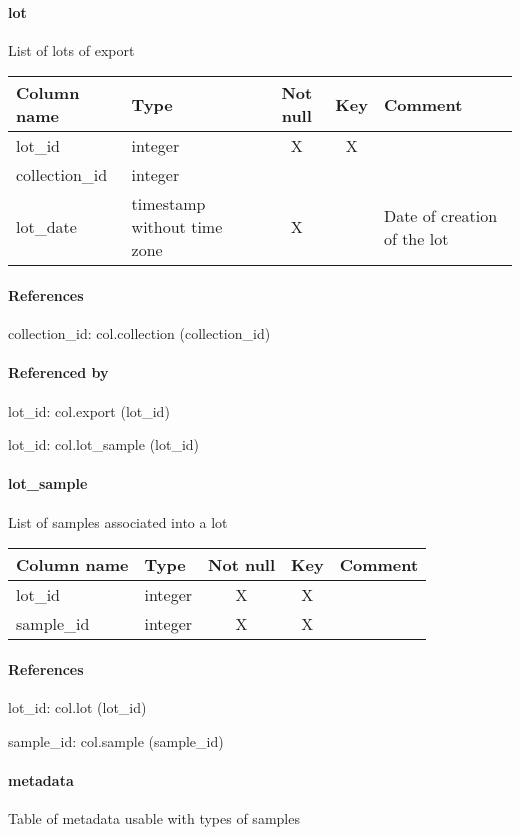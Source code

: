 \paragraph{lot}
List of lots of export

\begin{tabular}{|l| p{2cm}|c|c| p{5cm}|}
\hline
Column name & Type & Not null & Key & Comment \\
\hline
lot\_id & integer & X & X & \\
collection\_id & integer &  &  & \\
lot\_date & timestamp without time zone & X &  & Date of creation of the lot\\
\hline
\end{tabular}
\paragraph{References}
collection\_id: col.collection (collection\_id)

\paragraph{Referenced by}
lot\_id: col.export (lot\_id)

lot\_id: col.lot\_sample (lot\_id)

\paragraph{lot\_sample}
List of samples associated into a lot

\begin{tabular}{|l| p{2cm}|c|c| p{5cm}|}
\hline
Column name & Type & Not null & Key & Comment \\
\hline
lot\_id & integer & X & X & \\
sample\_id & integer & X & X & \\
\hline
\end{tabular}
\paragraph{References}
lot\_id: col.lot (lot\_id)

sample\_id: col.sample (sample\_id)

\paragraph{metadata}
Table of metadata usable with types of samples

